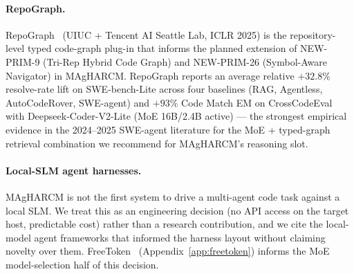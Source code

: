 \paragraph{RepoGraph.}
RepoGraph~\citep{repograph2025} (UIUC + Tencent AI Seattle Lab, ICLR
2025) is the repository-level typed code-graph plug-in that informs
the planned extension of NEW-PRIM-9 (Tri-Rep Hybrid Code Graph) and
NEW-PRIM-26 (Symbol-Aware Navigator) in MAgHARCM. RepoGraph reports
an average relative $+32.8\%$ resolve-rate lift on SWE-bench-Lite
across four baselines (RAG, Agentless, AutoCodeRover, SWE-agent) and
$+93\%$ Code Match EM on CrossCodeEval with Deepseek-Coder-V2-Lite
(MoE 16B/2.4B active) --- the strongest empirical evidence in the
2024--2025 SWE-agent literature for the MoE + typed-graph retrieval
combination we recommend for MAgHARCM's reasoning slot.

\paragraph{Local-SLM agent harnesses.}
MAgHARCM is not the first system to drive a multi-agent code task
against a local SLM. We treat this as an engineering decision (no
API access on the target host, predictable cost) rather than a
research contribution, and we cite the local-model agent frameworks
that informed the harness layout without claiming novelty over them.
FreeToken~\citep{freetoken2026} (Appendix~\ref{app:freetoken})
informs the MoE model-selection half of this decision.
